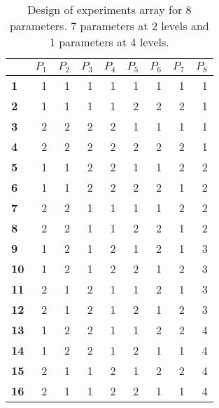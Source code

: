 \begin{table}[tb]
\centering
\caption{Design of experiments array for 8 parameters. 7 parameters at 2 levels and 1 parameters at 4 levels.}
\label{tab:L16}
\begin{tabular}{lrrrrrrrr}
\toprule
{} & $P_1$ & $P_2$ & $P_3$ & $P_4$ & $P_5$ & $P_6$ & $P_7$ & $P_8$ \\
\midrule
\textbf{1 } &     1 &     1 &     1 &     1 &     1 &     1 &     1 &     1 \\
\textbf{2 } &     1 &     1 &     1 &     1 &     2 &     2 &     2 &     1 \\
\textbf{3 } &     2 &     2 &     2 &     2 &     1 &     1 &     1 &     1 \\
\textbf{4 } &     2 &     2 &     2 &     2 &     2 &     2 &     2 &     1 \\
\textbf{5 } &     1 &     1 &     2 &     2 &     1 &     1 &     2 &     2 \\
\textbf{6 } &     1 &     1 &     2 &     2 &     2 &     2 &     1 &     2 \\
\textbf{7 } &     2 &     2 &     1 &     1 &     1 &     1 &     2 &     2 \\
\textbf{8 } &     2 &     2 &     1 &     1 &     2 &     2 &     1 &     2 \\
\textbf{9 } &     1 &     2 &     1 &     2 &     1 &     2 &     1 &     3 \\
\textbf{10} &     1 &     2 &     1 &     2 &     2 &     1 &     2 &     3 \\
\textbf{11} &     2 &     1 &     2 &     1 &     1 &     2 &     1 &     3 \\
\textbf{12} &     2 &     1 &     2 &     1 &     2 &     1 &     2 &     3 \\
\textbf{13} &     1 &     2 &     2 &     1 &     1 &     2 &     2 &     4 \\
\textbf{14} &     1 &     2 &     2 &     1 &     2 &     1 &     1 &     4 \\
\textbf{15} &     2 &     1 &     1 &     2 &     1 &     2 &     2 &     4 \\
\textbf{16} &     2 &     1 &     1 &     2 &     2 &     1 &     1 &     4 \\
\bottomrule
\end{tabular}
\end{table}
